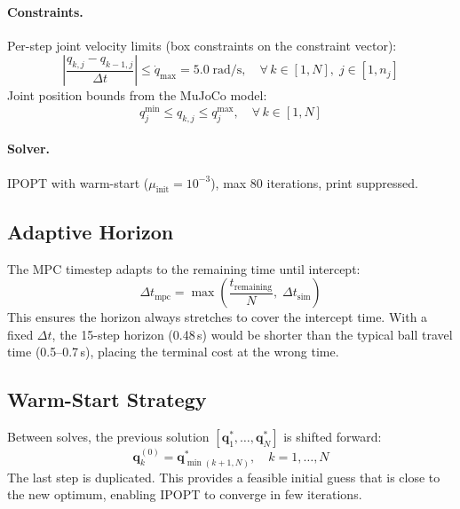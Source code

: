 \documentclass[11pt,letterpaper]{article}
\newcommand{\vv}[1]{\mathbf{#1}}
\begin{document}
\paragraph{Constraints.}

Per-step joint velocity limits (box constraints on the constraint vector):
\begin{equation}
    \left|\frac{q_{k,j} - q_{k-1,j}}{\Delta t}\right| \leq \dot{q}_{\max} = 5.0\;\text{rad/s}, \quad \forall\, k \in [1, N],\; j \in [1, n_j]
\end{equation}
Joint position bounds from the MuJoCo model:
\begin{equation}
    q_j^{\min} \leq q_{k,j} \leq q_j^{\max}, \quad \forall\, k \in [1, N]
\end{equation}

\paragraph{Solver.}  IPOPT with warm-start ($\mu_{\text{init}} = 10^{-3}$), max 80 iterations, print suppressed.

\subsection{Adaptive Horizon}

The MPC timestep adapts to the remaining time until intercept:
\begin{equation}
    \Delta t_{\text{mpc}} = \max\!\left(\frac{t_{\text{remaining}}}{N},\; \Delta t_{\text{sim}}\right)
\end{equation}
This ensures the horizon always stretches to cover the intercept time.  With a fixed $\Delta t$, the 15-step horizon (0.48\,s) would be shorter than the typical ball travel time (0.5--0.7\,s), placing the terminal cost at the wrong time.

\subsection{Warm-Start Strategy}

Between solves, the previous solution $[\vv{q}_1^*, \ldots, \vv{q}_N^*]$ is shifted forward:
\begin{equation}
    \vv{q}_k^{(0)} = \vv{q}_{\min(k+1, N)}^*, \quad k = 1, \ldots, N
\end{equation}
The last step is duplicated.  This provides a feasible initial guess that is close to the new optimum, enabling IPOPT to converge in few iterations.
\end{document}
